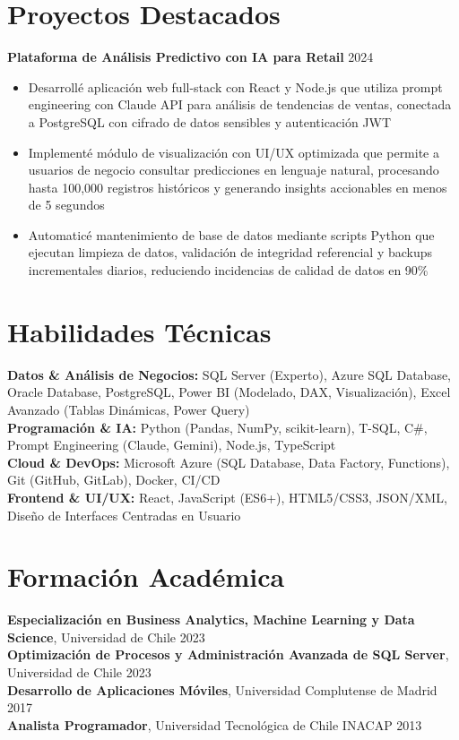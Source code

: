 \documentclass[11pt,letterpaper]{article}
\begin{document}
\section{Proyectos Destacados}

\textbf{Plataforma de Análisis Predictivo con IA para Retail} \hfill 2024
\begin{itemize}
  \item Desarrollé aplicación web full-stack con React y Node.js que utiliza prompt engineering con Claude API para análisis de tendencias de ventas, conectada a PostgreSQL con cifrado de datos sensibles y autenticación JWT
  \item Implementé módulo de visualización con UI/UX optimizada que permite a usuarios de negocio consultar predicciones en lenguaje natural, procesando hasta 100,000 registros históricos y generando insights accionables en menos de 5 segundos
  \item Automaticé mantenimiento de base de datos mediante scripts Python que ejecutan limpieza de datos, validación de integridad referencial y backups incrementales diarios, reduciendo incidencias de calidad de datos en 90\%
\end{itemize}

\section{Habilidades T\'{e}cnicas}
\textbf{Datos \& Análisis de Negocios:} SQL Server (Experto), Azure SQL Database, Oracle Database, PostgreSQL, Power BI (Modelado, DAX, Visualización), Excel Avanzado (Tablas Dinámicas, Power Query) \\
\textbf{Programación \& IA:} Python (Pandas, NumPy, scikit-learn), T-SQL, C\#, Prompt Engineering (Claude, Gemini), Node.js, TypeScript \\
\textbf{Cloud \& DevOps:} Microsoft Azure (SQL Database, Data Factory, Functions), Git (GitHub, GitLab), Docker, CI/CD \\
\textbf{Frontend \& UI/UX:} React, JavaScript (ES6+), HTML5/CSS3, JSON/XML, Diseño de Interfaces Centradas en Usuario

\section{Formaci\'{o}n Acad\'{e}mica}
\textbf{Especialización en Business Analytics, Machine Learning y Data Science}, Universidad de Chile \hfill 2023 \\
\textbf{Optimización de Procesos y Administración Avanzada de SQL Server}, Universidad de Chile \hfill 2023 \\
\textbf{Desarrollo de Aplicaciones Móviles}, Universidad Complutense de Madrid \hfill 2017 \\
\textbf{Analista Programador}, Universidad Tecnológica de Chile INACAP \hfill 2013
\end{document}
